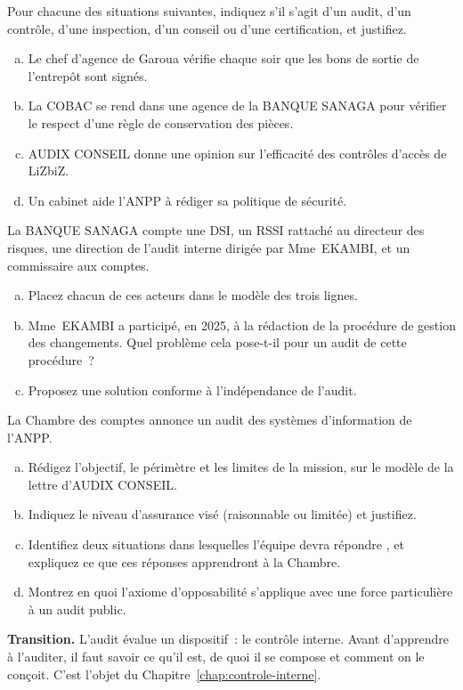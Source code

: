 \bigskip

\begin{boxexo}[title={\ding{45}\quad Exercice~1.1. Quelle activité~? \niveaubase}]
Pour chacune des situations suivantes, indiquez s'il s'agit d'un audit,
d'un contrôle, d'une inspection, d'un conseil ou d'une certification, et
justifiez.
\begin{enumerate}[(a)]
    \item Le chef d'agence de Garoua vérifie chaque soir que les bons de
          sortie de l'entrepôt sont signés.
    \item La COBAC se rend dans une agence de la BANQUE SANAGA pour vérifier
          le respect d'une règle de conservation des pièces.
    \item AUDIX CONSEIL donne une opinion sur l'efficacité des contrôles
          d'accès de LiZbiZ.
    \item Un cabinet aide l'ANPP à rédiger sa politique de sécurité.
\end{enumerate}
\end{boxexo}

\begin{boxexo}[title={\ding{45}\quad Exercice~1.2. Les trois lignes de la BANQUE SANAGA \niveaumoyen}]
La BANQUE SANAGA compte une DSI, un RSSI rattaché au directeur des
risques, une direction de l'audit interne dirigée par Mme~EKAMBI, et un
commissaire aux comptes.
\begin{enumerate}[(a)]
    \item Placez chacun de ces acteurs dans le modèle des trois lignes.
    \item Mme~EKAMBI a participé, en 2025, à la rédaction de la procédure de
          gestion des changements. Quel problème cela pose-t-il pour un
          audit de cette procédure~?
    \item Proposez une solution conforme à l'indépendance de l'audit.
\end{enumerate}
\end{boxexo}

\begin{boxexo}[title={\ding{45}\quad Exercice~1.3. Une lettre de mission \niveauexpert}]
La Chambre des comptes annonce un audit des systèmes d'information de
l'ANPP.
\begin{enumerate}[(a)]
    \item Rédigez l'objectif, le périmètre et les limites de la mission, sur
          le modèle de la lettre d'AUDIX CONSEIL.
    \item Indiquez le niveau d'assurance visé (raisonnable ou limitée) et
          justifiez.
    \item Identifiez deux situations dans lesquelles l'équipe devra répondre
          \NEK{}, et expliquez ce que ces réponses apprendront à la Chambre.
    \item Montrez en quoi l'axiome d'opposabilité s'applique avec une force
          particulière à un audit public.
\end{enumerate}
\end{boxexo}

\bigskip

\begin{boxinfo}
\textbf{Transition.} L'audit évalue un dispositif~: le contrôle interne.
Avant d'apprendre à l'auditer, il faut savoir ce qu'il est, de quoi il se
compose et comment on le conçoit. C'est l'objet du
Chapitre~\ref{chap:controle-interne}.
\end{boxinfo}

